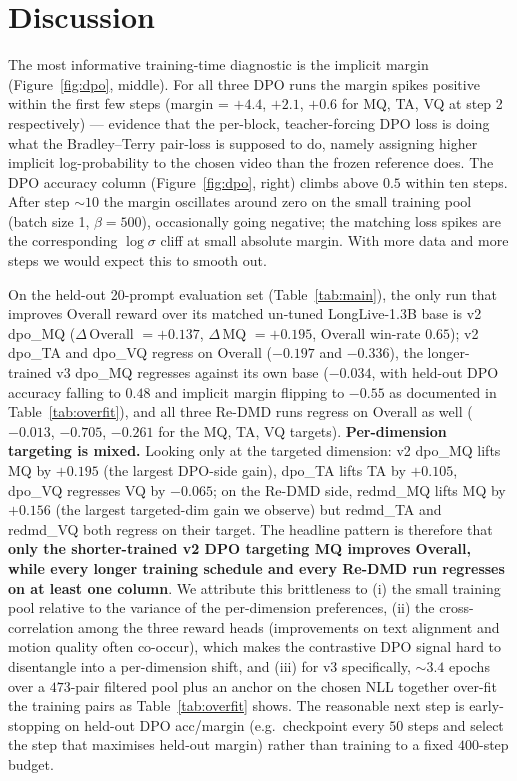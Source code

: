 \documentclass{article}
\begin{document}
\section{Discussion}

The most informative training-time diagnostic is the implicit margin (Figure~\ref{fig:dpo}, middle). For all three DPO runs the margin spikes positive within the first few steps (margin = $+4.4$, $+2.1$, $+0.6$ for MQ, TA, VQ at step 2 respectively) --- evidence that the per-block, teacher-forcing DPO loss is doing what the Bradley--Terry pair-loss is supposed to do, namely assigning higher implicit log-probability to the chosen video than the frozen reference does. The DPO accuracy column (Figure~\ref{fig:dpo}, right) climbs above $0.5$ within ten steps. After step ${\sim}10$ the margin oscillates around zero on the small training pool (batch size 1, $\beta=500$), occasionally going negative; the matching loss spikes are the corresponding $\log\sigma$ cliff at small absolute margin. With more data and more steps we would expect this to smooth out.

On the held-out 20-prompt evaluation set (Table~\ref{tab:main}), the only run that improves Overall reward over its matched un-tuned LongLive-1.3B base is v2 dpo\_MQ ($\Delta$\,Overall $=+0.137$, $\Delta$\,MQ $=+0.195$, Overall win-rate $0.65$); v2 dpo\_TA and dpo\_VQ regress on Overall ($-0.197$ and $-0.336$), the longer-trained v3 dpo\_MQ regresses against its own base ($-0.034$, with held-out DPO accuracy falling to $0.48$ and implicit margin flipping to $-0.55$ as documented in Table~\ref{tab:overfit}), and all three Re-DMD runs regress on Overall as well ($-0.013$, $-0.705$, $-0.261$ for the MQ, TA, VQ targets). \textbf{Per-dimension targeting is mixed.} Looking only at the targeted dimension: v2 dpo\_MQ lifts MQ by $+0.195$ (the largest DPO-side gain), dpo\_TA lifts TA by $+0.105$, dpo\_VQ regresses VQ by $-0.065$; on the Re-DMD side, redmd\_MQ lifts MQ by $+0.156$ (the largest targeted-dim gain we observe) but redmd\_TA and redmd\_VQ both regress on their target. The headline pattern is therefore that \textbf{only the shorter-trained v2 DPO targeting MQ improves Overall, while every longer training schedule and every Re-DMD run regresses on at least one column}. We attribute this brittleness to (i) the small training pool relative to the variance of the per-dimension preferences, (ii) the cross-correlation among the three reward heads (improvements on text alignment and motion quality often co-occur), which makes the contrastive DPO signal hard to disentangle into a per-dimension shift, and (iii) for v3 specifically, $\sim3.4$ epochs over a $473$-pair filtered pool plus an anchor on the chosen NLL together over-fit the training pairs as Table~\ref{tab:overfit} shows. The reasonable next step is early-stopping on held-out DPO acc/margin (e.g.\ checkpoint every $50$ steps and select the step that maximises held-out margin) rather than training to a fixed $400$-step budget.
\end{document}
